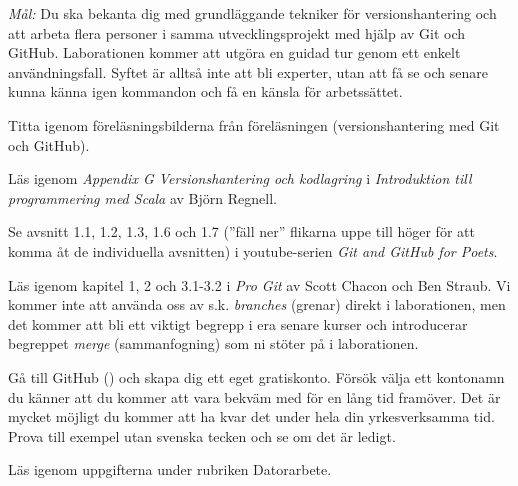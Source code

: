 
\def\reponame{dod-lab-git}   %


\Lab{\LabWeekNINEdod}
\begin{Goals}
\item \emph{Mål:} Du ska bekanta dig med grundläggande tekniker för versionshantering och att arbeta flera personer i samma utvecklingsprojekt med hjälp av Git och GitHub. Laborationen kommer att utgöra en guidad tur genom ett enkelt användningsfall. Syftet är alltså inte att bli experter, utan att få se och senare kunna känna igen kommandon och få en känsla för arbetssättet.
\end{Goals}

\begin{Preparations}
\item Titta igenom föreläsningsbilderna från föreläsningen (versionshantering med Git och GitHub).
\item Läs igenom \emph{Appendix G Versionshantering och kodlagring} i \emph{Introduktion till programmering med Scala} av Björn Regnell.
\item Se avsnitt 1.1, 1.2, 1.3, 1.6 och 1.7 (''fäll ner'' flikarna uppe till höger för att komma åt de individuella avsnitten) i youtube-serien \emph{Git and GitHub for Poets}.
\item Läs igenom kapitel 1, 2 och 3.1-3.2 i \emph{Pro Git} av Scott Chacon och Ben Straub. Vi kommer inte att använda oss av s.k. \emph{branches} (grenar) direkt i laborationen, men det kommer att bli ett viktigt begrepp i era senare kurser och introducerar begreppet \emph{merge} (sammanfogning) som ni stöter på i laborationen.
\item Gå till GitHub () och skapa dig ett eget gratiskonto. Försök välja ett kontonamn du känner att du kommer att vara bekväm med för en lång tid framöver. Det är mycket möjligt du kommer att ha kvar det under hela din yrkesverksamma tid. Prova till exempel  utan svenska tecken och se om det är ledigt.
\item Läs igenom uppgifterna under rubriken Datorarbete.
\end{Preparations}

